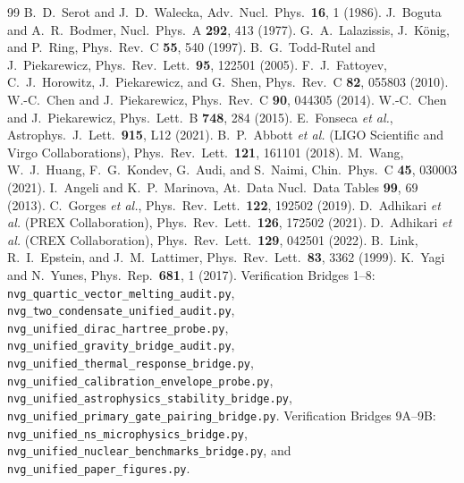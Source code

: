 \documentclass[aps,prc,twocolumn,superscriptaddress,nofootinbib,floatfix]{revtex4-2}
\begin{document}
\begin{thebibliography}{99}
 B.~D.~Serot and J.~D.~Walecka, Adv.\ Nucl.\ Phys.\ \textbf{16}, 1 (1986).
 J.~Boguta and A.~R.~Bodmer, Nucl.\ Phys.\ A \textbf{292}, 413 (1977).
 G.~A.~Lalazissis, J.~K\"onig, and P.~Ring, Phys.\ Rev.\ C \textbf{55}, 540 (1997).
 B.~G.~Todd-Rutel and J.~Piekarewicz, Phys.\ Rev.\ Lett.\ \textbf{95}, 122501 (2005).
 F.~J.~Fattoyev, C.~J.~Horowitz, J.~Piekarewicz, and G.~Shen, Phys.\ Rev.\ C \textbf{82}, 055803 (2010).
 W.-C.~Chen and J.~Piekarewicz, Phys.\ Rev.\ C \textbf{90}, 044305 (2014).
 W.-C.~Chen and J.~Piekarewicz, Phys.\ Lett.\ B \textbf{748}, 284 (2015).
 E.~Fonseca \textit{et al.}, Astrophys.\ J.\ Lett.\ \textbf{915}, L12 (2021).
 B.~P.~Abbott \textit{et al.} (LIGO Scientific and Virgo Collaborations), Phys.\ Rev.\ Lett.\ \textbf{121}, 161101 (2018).
 M.~Wang, W.~J.~Huang, F.~G.~Kondev, G.~Audi, and S.~Naimi, Chin.\ Phys.\ C \textbf{45}, 030003 (2021).
 I.~Angeli and K.~P.~Marinova, At.\ Data Nucl.\ Data Tables \textbf{99}, 69 (2013).
 C.~Gorges \textit{et al.}, Phys.\ Rev.\ Lett.\ \textbf{122}, 192502 (2019).
 D.~Adhikari \textit{et al.} (PREX Collaboration), Phys.\ Rev.\ Lett.\ \textbf{126}, 172502 (2021).
 D.~Adhikari \textit{et al.} (CREX Collaboration), Phys.\ Rev.\ Lett.\ \textbf{129}, 042501 (2022).
 B.~Link, R.~I.~Epstein, and J.~M.~Lattimer, Phys.\ Rev.\ Lett.\ \textbf{83}, 3362 (1999).
 K.~Yagi and N.~Yunes, Phys.\ Rep.\ \textbf{681}, 1 (2017).
 Verification Bridges 1--8: \texttt{nvg\_quartic\_vector\_melting\_audit.py}, \texttt{nvg\_two\_condensate\_unified\_audit.py}, \texttt{nvg\_unified\_dirac\_hartree\_probe.py}, \texttt{nvg\_unified\_gravity\_bridge\_audit.py}, \texttt{nvg\_unified\_thermal\_response\_bridge.py}, \texttt{nvg\_unified\_calibration\_envelope\_probe.py}, \texttt{nvg\_unified\_astrophysics\_stability\_bridge.py}, \texttt{nvg\_unified\_primary\_gate\_pairing\_bridge.py}.
 Verification Bridges 9A--9B: \texttt{nvg\_unified\_ns\_microphysics\_bridge.py}, \texttt{nvg\_unified\_nuclear\_benchmarks\_bridge.py}, and \texttt{nvg\_unified\_paper\_figures.py}.
\end{thebibliography}
\end{document}
